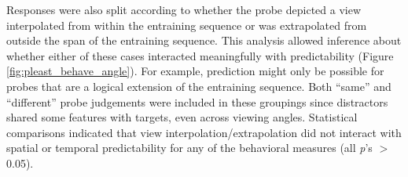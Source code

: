 \documentclass[dwyatte_dissertation.tex]{subfiles}
\begin{document}
Responses were also split according to whether the probe depicted a view interpolated from within the entraining sequence or was extrapolated from outside the span of the entraining sequence. This analysis allowed inference about whether either of these cases interacted meaningfully with predictability (Figure \ref{fig:pleast_behave_angle}). For example, prediction might   only be possible for probes that are a logical extension of the entraining sequence. Both ``same'' and ``different'' probe judgements were included in these groupings since distractors shared some features with targets, even across viewing angles. Statistical comparisons indicated that view interpolation/extrapolation did not interact with spatial or temporal predictability for any of the behavioral measures (all \textit{p}'s $>$ 0.05).

\end{document}
